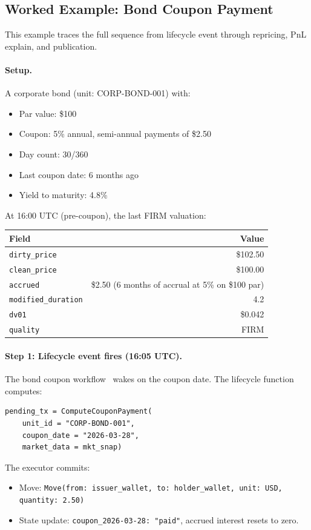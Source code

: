 \documentclass[11pt,a4paper]{article}
\begin{document}
\subsection{Worked Example: Bond Coupon Payment}
\label{sec:worked-coupon}

This example traces the full sequence from lifecycle event through repricing, PnL explain, and publication.

\paragraph{Setup.}  A corporate bond (unit: CORP-BOND-001) with:
\begin{itemize}[nosep]
\item Par value: \$100
\item Coupon: 5\% annual, semi-annual payments of \$2.50
\item Day count: 30/360
\item Last coupon date: 6 months ago
\item Yield to maturity: 4.8\%
\end{itemize}

\noindent At 16:00 UTC (pre-coupon), the last FIRM valuation:
\begin{center}
\small
\begin{tabular}{l r}
\toprule
\textbf{Field} & \textbf{Value} \\
\midrule
\texttt{dirty\_price} & \$102.50 \\
\texttt{clean\_price} & \$100.00 \\
\texttt{accrued} & \$2.50 (6 months of accrual at 5\% on \$100 par) \\
\texttt{modified\_duration} & 4.2 \\
\texttt{dv01} & \$0.042 \\
\texttt{quality} & FIRM \\
\bottomrule
\end{tabular}
\end{center}

\paragraph{Step 1: Lifecycle event fires (16:05 UTC).}  The bond coupon workflow~\cite[\S14.4.2]{ledger} wakes on the coupon date.  The lifecycle function computes:
\begin{lstlisting}
pending_tx = ComputeCouponPayment(
    unit_id = "CORP-BOND-001",
    coupon_date = "2026-03-28",
    market_data = mkt_snap)
\end{lstlisting}
The executor commits:
\begin{itemize}[nosep]
\item Move: \texttt{Move(from: issuer\_wallet, to: holder\_wallet, unit: USD, quantity: 2.50)}
\item State update: \texttt{coupon\_2026-03-28: "paid"}, accrued interest resets to zero.
\end{itemize}
\end{document}
